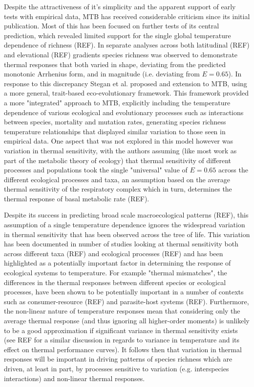 \documentclass{article}
\begin{document}
Despite the attractiveness of it's simplicity and the apparent support of early tests with empirical data, MTB has received considerable criticism since its initial publication. Most of this has been focused on further tests of its central prediction, which revealed limited support for the single global temperature dependence of richness (REF). In separate analyses across both latitudinal (REF) and elevational (REF) gradients species richness was observed to demonstrate thermal responses that both varied in shape, deviating from the predicted monotonic Arrhenius form, and in magnitude (i.e. deviating from $E = 0.65$). In response to this discrepancy Stegan et al. proposed and extension to MTB, using a more general, trait-based eco-evolutionary framework. This framework provided a more "integrated" approach to MTB, explicitly including the temperature dependence of various ecological and evolutionary processes such as interactions between species, mortality and mutation rates, generating species richness temperature relationships that displayed similar variation to those seen in empirical data. One aspect that was not explored in this model however was variation in thermal sensitivity, with the authors assuming (like most work as part of the metabolic theory of ecology) that thermal sensitivity of different processes and populations took the single "universal" value of $E=0.65$ across the different ecological processes and taxa, an assumption based on the average thermal sensitivity of the respiratory complex which in turn, determines the thermal response of basal metabolic rate (REF).

Despite its success in predicting broad scale macroecological patterns (REF), this assumption of a single temperature dependence ignores the widespread variation in thermal sensitivity that has been observed across the tree of life. This variation has been documented in number of studies looking at thermal sensitivity both across different taxa (REF) and ecological processes (REF) and has been highlighted as a potentially important factor in determining the response of ecological systems to temperature. For example "thermal mismatches", the differences in the thermal responses between different species or ecological processes, have been shown to be potentially important in a number of contexts such as consumer-resource (REF) and parasite-host systems (REF). Furthermore, the non-linear nature of temperature responses mean that considering only the average thermal response (and thus ignoring all higher-order moments) is unlikely to be a good approximation if significant variance in thermal sensitivity exists (see REF for a similar discussion in regards to variance in temperature and its effect on thermal performance curves). It follows then that variation in thermal responses will be important in driving patterns of species richness which are driven, at least in part, by processes sensitive to variation (e.g. interspecies interactions) and non-linear thermal responses. 
\end{document}
